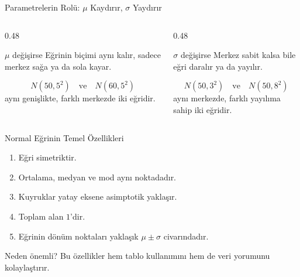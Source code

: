 \documentclass[light]{lutbeamer}
\begin{document}
\begin{frame}{Parametrelerin Rolü: \(\mu\) Kaydırır, \(\sigma\) Yaydırır}
    \small
    \begin{columns}[T]
        \begin{column}{0.48\textwidth}
            \begin{block}{\(\mu\) değişirse}
                Eğrinin biçimi aynı kalır, sadece merkez sağa ya da sola kayar.
            \end{block}

            \[
            N(50,5^2) \quad \text{ve} \quad N(60,5^2)
            \]
            aynı genişlikte, farklı merkezde iki eğridir.
        \end{column}
        \begin{column}{0.48\textwidth}
            \begin{block}{\(\sigma\) değişirse}
                Merkez sabit kalsa bile eğri daralır ya da yayılır.
            \end{block}

            \[
            N(50,3^2) \quad \text{ve} \quad N(50,8^2)
            \]
            aynı merkezde, farklı yayılıma sahip iki eğridir.
        \end{column}
    \end{columns}
\end{frame}

\begin{frame}{Normal Eğrinin Temel Özellikleri}
    \small
    \begin{enumerate}
        \item Eğri simetriktir.
        \item Ortalama, medyan ve mod aynı noktadadır.
        \item Kuyruklar yatay eksene asimptotik yaklaşır.
        \item Toplam alan \(1\)'dir.
        \item Eğrinin dönüm noktaları yaklaşık \(\mu \pm \sigma\) civarındadır.
    \end{enumerate}

    \begin{exampleblock}{Neden önemli?}
        Bu özellikler hem tablo kullanımını hem de veri yorumunu kolaylaştırır.
    \end{exampleblock}
\end{frame}
\end{document}
